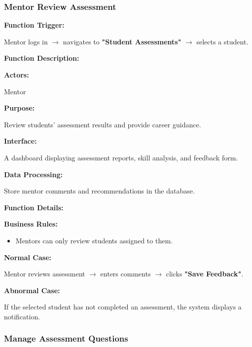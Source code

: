 \subsubsection{Mentor Review Assessment}

\textbf{Function Trigger:}

Mentor logs in $\rightarrow$ navigates to \textbf{"Student Assessments"} $\rightarrow$ selects a student.

\vspace{0.3cm}

\textbf{Function Description:}

\textbf{Actors:}

Mentor

\vspace{0.2cm}

\textbf{Purpose:}

Review students' assessment results and provide career guidance.

\vspace{0.2cm}

\textbf{Interface:}

A dashboard displaying assessment reports, skill analysis, and feedback form.

\vspace{0.2cm}

\textbf{Data Processing:}

Store mentor comments and recommendations in the database.

\vspace{0.3cm}

\textbf{Function Details:}

\textbf{Business Rules:}

\begin{itemize}
\item Mentors can only review students assigned to them.
\end{itemize}

\textbf{Normal Case:}

Mentor reviews assessment $\rightarrow$ enters comments $\rightarrow$ clicks \textbf{"Save Feedback"}.

\textbf{Abnormal Case:}

If the selected student has not completed an assessment, the system displays a notification.


\subsubsection{Manage Assessment Questions}

